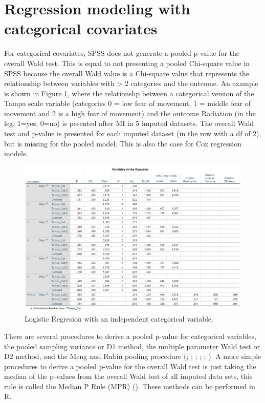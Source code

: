 \documentclass[
]{book}
\begin{document}
\hypertarget{regression-modeling-with-categorical-covariates}{%
\section{Regression modeling with categorical covariates}\label{regression-modeling-with-categorical-covariates}}

For categorical covariates, SPSS does not generate a pooled p-value for the overall Wald test. This is equal to not presenting a pooled Chi-square value in SPSS because the overall Wald value is a Chi-square value that represents the relationship between variables with \textgreater{} 2 categories and the outcome. An example is shown in Figure \ref{fig:fig6-1}, where the relationshp between a categorical version of the Tampa scale variable (categories 0 = low fear of movement, 1 = middle fear of movement and 2 is a high fear of movement) and the outcome Radiation (in the leg, 1=yes, 0=no) is pesented after MI in 5 imputed datasets. The overall Wald test and p-value is presented for each imputed dataset (in the row with a df of 2), but is missing for the pooled model. This is also the case for Cox regression models.

\begin{figure}

{\centering \includegraphics[width=0.9\linewidth]{images/fig6.1_logistic} 

}

\caption{Logistic Regresion with an independent categorical variable.}\label{fig:fig6-1}
\end{figure}

There are several procedures to derive a pooled p-value for categorical variables, the pooled sampling variance or D1 method, the multiple parameter Wald test or D2 method, and the Meng and Rubin pooling procedure (\citet{VanBuuren2018}; \citet{enders2010applied}; \citet{Eekhout2017}; \citet{Meng1992}; \citet{Mistler2013}; \citet{Marshall2009MedResMeth}). A more simple procedures to derive a pooled p-value for the overall Wald test is just taking the median of the p-values from the overall Wald test of all imputed data sets, this rule is called the Median P Rule (MPR) (\citet{Eekhout2017}). These methods can be performed in R.
\end{document}
